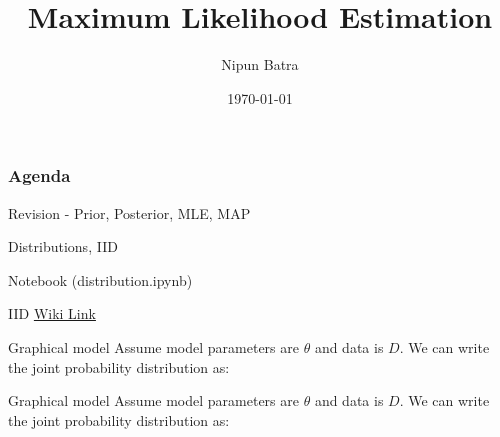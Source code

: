 \documentclass[handout]{beamer}
\begin{document}
\title{Maximum Likelihood Estimation}
\author{Nipun Batra}
\date{\today}
\maketitle
{}
\begin{frame}
    \frametitle{Agenda}
    \tableofcontents[hidesubsections]
    \end{frame}
    
\begin{section}{Revision - Prior, Posterior, MLE, MAP}
\end{section}
\begin{section}{Distributions, IID}
    \begin{frame}
        Notebook (distribution.ipynb)
    \end{frame}

    \begin{frame}{IID}
        \href{https://en.wikipedia.org/wiki/Independent_and_identically_distributed_random_variables}{Wiki Link}
    \end{frame}
        


    
    \begin{frame}{Graphical model}
        Assume model parameters are $\theta$ and data is $D  $. We can write the joint probability distribution as: \\
        \vspace{10pt}
        
    \end{frame}

    \begin{frame}{Graphical model}
        Assume model parameters are $\theta$ and data is $D  $. We can write the joint probability distribution as:


\end{frame}
\end{section}
\end{document}
